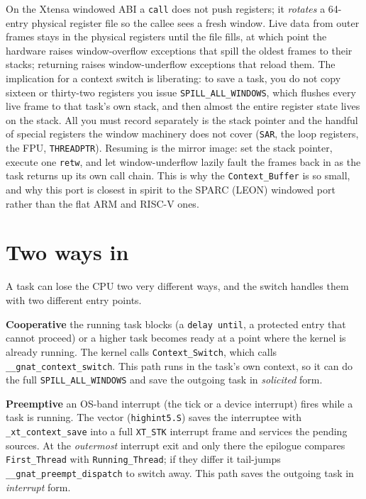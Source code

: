 On the Xtensa windowed ABI a \texttt{call} does not push registers; it
\emph{rotates} a 64-entry physical register file so the callee sees a fresh
window. Live data from outer frames stays in the physical registers until the
file fills, at which point the hardware raises window-overflow exceptions that
spill the oldest frames to their stacks; returning raises window-underflow
exceptions that reload them. The implication for a context switch is liberating:
to save a task, you do not copy sixteen or thirty-two registers \textemdash{} you
issue \texttt{SPILL\_ALL\_WINDOWS}, which flushes every live frame to that task's
own stack, and then almost the entire register state lives on the stack. All you
must record separately is the stack pointer and the handful of special registers
the window machinery does not cover (\texttt{SAR}, the loop registers, the FPU,
\texttt{THREADPTR}). Resuming is the mirror image: set the stack pointer, execute
one \texttt{retw}, and let window-underflow lazily fault the frames back in as the
task returns up its own call chain. This is why the \texttt{Context\_Buffer} is so
small, and why this port is closest in spirit to the SPARC (LEON) windowed port
rather than the flat ARM and RISC-V ones.

\section{Two ways in}

A task can lose the CPU two very different ways, and the switch handles them with
two different entry points.

\textbf{Cooperative} \textemdash{} the running task blocks (a \texttt{delay
until}, a protected entry that cannot proceed) or a higher task becomes ready at
a point where the kernel is already running. The kernel calls
\texttt{Context\_Switch}, which calls \texttt{\_\_gnat\_context\_switch}. This path
runs in the task's own context, so it can do the full \texttt{SPILL\_ALL\_WINDOWS}
and save the outgoing task in \emph{solicited} form.

\textbf{Preemptive} \textemdash{} an OS-band interrupt (the tick or a device
interrupt) fires while a task is running. The vector (\texttt{highint5.S})
saves the interruptee with \texttt{\_xt\_context\_save} into a full
\texttt{XT\_STK} interrupt frame and services the pending sources. At the
\emph{outermost} interrupt exit \textemdash{} and only there \textemdash{} the
epilogue compares \texttt{First\_Thread} with \texttt{Running\_Thread}; if
they differ it tail-jumps \texttt{\_\_gnat\_preempt\_dispatch} to switch away.
This path saves the outgoing task in \emph{interrupt} form.

